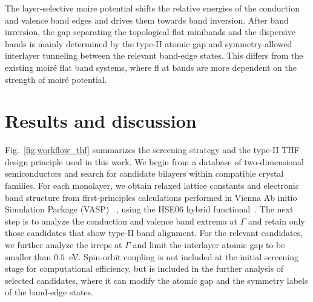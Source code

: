 \documentclass[aps, preprint, prb,]{revtex4-2}
\begin{document}
The layer-selective moire potential shifts the relative energies of the conduction and valence band edges and drives them towards band inversion. After band inversion, the gap separating the topological flat minibands and the dispersive bands is mainly determined by the type-II atomic gap and symmetry-allowed interlayer tunneling between the relevant band-edge states. This differs from the existing moir\'e flat band systems, where fl at bands are more dependent on the strength of moir\'e potential. 

\section{Results and discussion}
Fig.~\ref{fig:workflow_thf} summarizes the screening strategy and the type-II THF design principle used in this work. We begin from a database of two-dimensional semiconductors and search for candidate bilayers within compatible crystal families. For each monolayer, we obtain relaxed lattice constants and electronic band structure from first-principles calculations performed in Vienna Ab initio Simulation Package (VASP) ~\cite{kresse1996efficiency}, using the HSE06 hybrid functional~\cite{heyd2003hybrid}. The next step is to analyze the conduction and valence band extrema at $\Gamma$ and retain only those candidates that show type-II band alignment. For the relevant candidates, we further analyze the irreps at $\Gamma$ \cite{Gao2021Irvsp} and limit the interlayer atomic gap to be smaller than $0.5$~eV. Spin-orbit coupling is not included at the initial screening stage for computational efficiency, but is included in the further analysis of selected candidates, where it can modify the atomic gap and the symmetry labels of the band-edge states.
\end{document}

